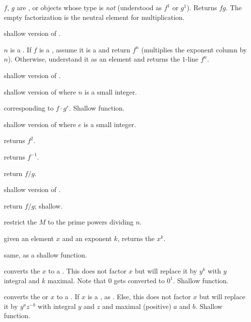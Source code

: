  $f$, $g$ are ,
or objects whose type is \emph{not}  (understood as $f^1$ or $g^1$).
Returns $fg$. The empty factorization is the neutral element for 
multiplication.

 shallow version of .

 $n$ is a . If $f$ is a ,
assume it is a  and return $f^n$ (multiplies the exponent column
by $n$). Otherwise, understand it as an element and returns the $1$-line
 $f^n$.

 shallow version of .

 shallow version of 
where $n$ is a small integer.

 
corresponding to $f \cdot g^e$. Shallow function.

 
shallow version of  where $e$ is a small integer.

 returns $f^2$.

 returns $f^{-1}$.

 return $f/g$.

 shallow version of .

 return $f/g$; shallow.

 restrict the  $M$ to
the prime powers dividing $n$.

 given an element $x$ and an exponent
$k$, returns the  $x^k$.

 same, as a shallow function.

 converts the  $x$ to a . This
does not factor $x$ but will replace it by $y^k$ with $y$ integral and $k$
maximal. Note that $0$ gets converted to $0^1$. Shallow function.

 converts the  or  $x$
to a . If $x$ is a , as . Else, this does
not factor $x$ but will replace it by $y^a z^{-b}$ with integral $y$ and $z$
and maximal (positive) $a$ and $b$. Shallow function.

